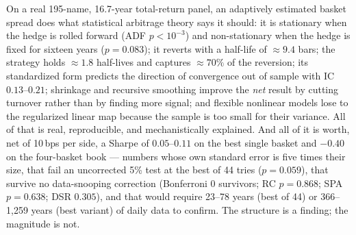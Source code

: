 On a real 195-name, 16.7-year total-return panel, an adaptively estimated basket spread
does what statistical arbitrage theory says it should: it is stationary when the hedge is
rolled forward (ADF $p<10^{-3}$) and non-stationary when the hedge is fixed for sixteen
years ($p=0.083$); it reverts with a half-life of $\approx9.4$ bars; the strategy holds
$\approx1.8$ half-lives and captures $\approx70\%$ of the reversion; its standardized form
predicts the direction of convergence out of sample with IC $0.13$--$0.21$; shrinkage and
recursive smoothing improve the \emph{net} result by cutting turnover rather than by
finding more signal; and flexible nonlinear models lose to the regularized linear map
because the sample is too small for their variance. All of that is real, reproducible, and
mechanistically explained. And all of it is worth, net of 10\,bps per side, a Sharpe of
$0.05$--$0.11$ on the best single basket and $-0.40$ on the four-basket book --- numbers
whose own standard error is five times their size, that fail an uncorrected 5\% test at the
best of 44 tries ($p=0.059$), that survive no data-snooping correction
(Bonferroni 0 survivors; RC $p=0.868$; SPA $p=0.638$; DSR $0.305$), and that would require
23--78 years (best of 44) or 366--1{,}259 years (best  variant) of daily data to
confirm. The structure is a finding; the magnitude is not.
